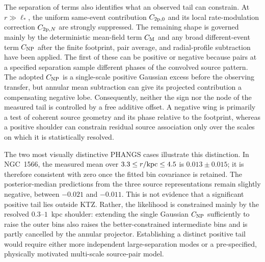 \documentclass[fleqn,usenatbib]{mnras}
\begin{document}
The separation of terms also identifies what an observed tail can constrain.  At $r\gg\ell_\ast$, the uniform same-event contribution $C_{{\rm 2p},0}$ and its local rate-modulation correction $C_{{\rm 2p},N}$ are strongly suppressed.  The remaining shape is governed mainly by the deterministic mean-field term $C_{\rm M}$ and any broad different-event term $C_{\rm NP}$ after the finite footprint, pair average, and radial-profile subtraction have been applied.  The first of these can be positive or negative because pairs at a specified separation sample different phases of the convolved source pattern.  The adopted $C_{\rm NP}$ is a single-scale positive Gaussian excess before the observing transfer, but annular mean subtraction can give its projected contribution a compensating negative lobe.  Consequently, neither the sign nor the node of the measured tail is controlled by a free additive offset.  A negative wing is primarily a test of coherent source geometry and its phase relative to the footprint, whereas a positive shoulder can constrain residual source association only over the scales on which it is statistically resolved.

The two most visually distinctive PHANGS cases illustrate this distinction.  In NGC~1566, the measured mean over $3.3\leq r/{\rm kpc}\leq4.5$ is $0.013\pm0.015$; it is therefore consistent with zero once the fitted bin covariance is retained.  The posterior-median predictions from the three source representations remain slightly negative, between $-0.021$ and $-0.011$.  This is not evidence that a significant positive tail lies outside KTZ.  Rather, the likelihood is constrained mainly by the resolved $0.3$--$1$~kpc shoulder: extending the single Gaussian $C_{\rm NP}$ sufficiently to raise the outer bins also raises the better-constrained intermediate bins and is partly cancelled by the annular projector.  Establishing a distinct positive tail would require either more independent large-separation modes or a pre-specified, physically motivated multi-scale source-pair model.
\end{document}
